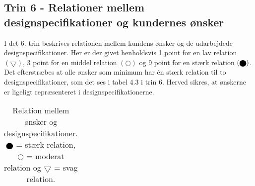 \subsection{Trin 6 - Relationer mellem designspecifikationer og kundernes ønsker} \label{Trin 6}
I det 6. trin beskrives relationen mellem kundens ønsker og de udarbejdede designspecifikationer. Her er der givet henholdsvis 1 point for en lav relation $(\bigtriangledown)$, 3 point for en middel relation $(\bigcirc)$ og 9 point for en stærk relation $(\blackbigcirc)$.  Det efterstræbes at alle ønsker som minimum har én stærk relation til to designspecifikationer, som det ses i tabel 4.3 i trin 6. Herved sikres, at ønskerne er ligeligt repræsenteret i designspecifikationerne.

\begin{table}[H]
\centering
\caption{ Relation mellem ønsker og designspecifikationer. $\protect\blackbigcirc$ = stærk relation, $\bigcirc$ = moderat relation og $\bigtriangledown$ = svag relation.}
\label{fig: HOQ trin 6} 
\footnotesize
\def\arraystretch{2}
\begin{tabular}{|p{}|c|c|c|c|c|c|c|c|c|c|c|c|}
    \hline

\end{tabular}
\end{table}
